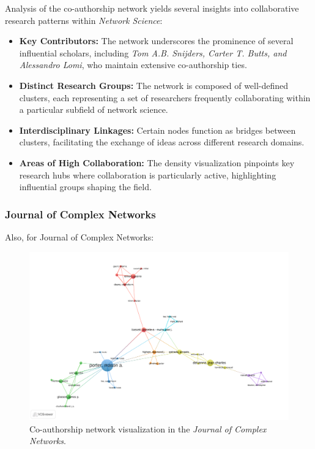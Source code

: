 \documentclass[twocolumn]{article}
\begin{document}
		Analysis of the co-authorship network yields several insights into collaborative research patterns within \textit{Network Science}:
		
		\begin{itemize}
			\item \textbf{Key Contributors:} The network underscores the prominence of several influential scholars, including \textit{Tom A.B. Snijders, Carter T. Butts, and Alessandro Lomi}, who maintain extensive co-authorship ties.
			\item \textbf{Distinct Research Groups:} The network is composed of well-defined clusters, each representing a set of researchers frequently collaborating within a particular subfield of network science.
			\item \textbf{Interdisciplinary Linkages:} Certain nodes function as bridges between clusters, facilitating the exchange of ideas across different research domains.
			\item \textbf{Areas of High Collaboration:} The density visualization pinpoints key research hubs where collaboration is particularly active, highlighting influential groups shaping the field.
		\end{itemize}
		
		\subsubsection*{Journal of Complex Networks}
		
		Also, for Journal of Complex Networks: 
		
		\begin{figure}[htbp]
			\centering
			\includegraphics[width=\columnwidth]{Journal of Complex Networks/VOS/co-authorship.pdf}
			\caption{Co-authorship network visualization in the \textit{Journal of Complex Networks}.}
			\label{fig.fig12}
		\end{figure}
		
\end{document}
